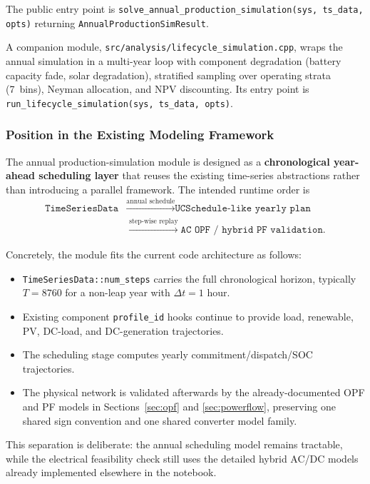 The public entry point is
\texttt{solve\_annual\_production\_simulation(sys, ts\_data, opts)} returning
\texttt{AnnualProductionSimResult}.

A companion module, \texttt{src/analysis/lifecycle\_simulation.cpp}, wraps the
annual simulation in a multi-year loop with component degradation (battery
capacity fade, solar degradation), stratified sampling over operating strata
(7~bins), Neyman allocation, and NPV discounting.  Its entry point is
\texttt{run\_lifecycle\_simulation(sys, ts\_data, opts)}.

\subsubsection{Position in the Existing Modeling Framework}

The annual production-simulation module is designed as a
\textbf{chronological year-ahead scheduling layer} that reuses the existing
time-series abstractions rather than introducing a parallel framework.
The intended runtime order is
\begin{align}
\texttt{TimeSeriesData}
&\xrightarrow{\text{annual schedule}}
\texttt{UCSchedule-like yearly plan} \\
&\xrightarrow{\text{step-wise replay}}
\texttt{AC OPF / hybrid PF validation}.
\end{align}

Concretely, the module fits the current code architecture as follows:
\begin{itemize}
\item \texttt{TimeSeriesData::num\_steps} carries the full chronological horizon,
  typically \(T=8760\) for a non-leap year with \(\Delta t=1\) hour.
\item Existing component \texttt{profile\_id} hooks continue to provide
  load, renewable, PV, DC-load, and DC-generation trajectories.
\item The scheduling stage computes yearly commitment/dispatch/SOC trajectories.
\item The physical network is validated afterwards by the already-documented
  OPF and PF models in Sections~\ref{sec:opf} and \ref{sec:powerflow},
  preserving one shared sign convention and one shared converter model family.
\end{itemize}

This separation is deliberate: the annual scheduling model remains tractable,
while the electrical feasibility check still uses the detailed hybrid AC/DC
models already implemented elsewhere in the notebook.

